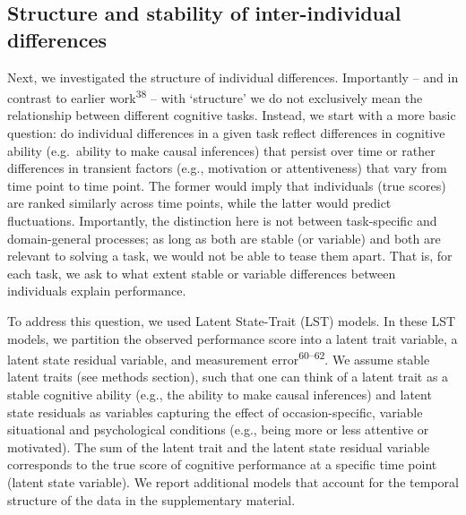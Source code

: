 \documentclass[
  man,floatsintext]{apa6}
\begin{document}
\hypertarget{structure-and-stability-of-inter-individual-differences}{%
\subsection{Structure and stability of inter-individual differences}\label{structure-and-stability-of-inter-individual-differences}}

Next, we investigated the structure of individual differences. Importantly -- and in contrast to earlier work\textsuperscript{38} -- with `structure' we do not exclusively mean the relationship between different cognitive tasks. Instead, we start with a more basic question: do individual differences in a given task reflect differences in cognitive ability (e.g.~ability to make causal inferences) that persist over time or rather differences in transient factors (e.g., motivation or attentiveness) that vary from time point to time point. The former would imply that individuals (true scores) are ranked similarly across time points, while the latter would predict fluctuations. Importantly, the distinction here is not between task-specific and domain-general processes; as long as both are stable (or variable) and both are relevant to solving a task, we would not be able to tease them apart. That is, for each task, we ask to what extent stable or variable differences between individuals explain performance.

To address this question, we used Latent State-Trait (LST) models. In these LST models, we partition the observed performance score into a latent trait variable, a latent state residual variable, and measurement error\textsuperscript{60--62}. We assume stable latent traits (see methods section), such that one can think of a latent trait as a stable cognitive ability (e.g., the ability to make causal inferences) and latent state residuals as variables capturing the effect of occasion-specific, variable situational and psychological conditions (e.g., being more or less attentive or motivated). The sum of the latent trait and the latent state residual variable corresponds to the true score of cognitive performance at a specific time point (latent state variable). We report additional models that account for the temporal structure of the data in the supplementary material.
\end{document}
